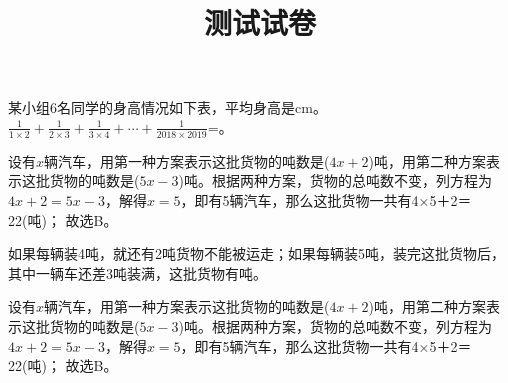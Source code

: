 \documentclass{BHCexam}
\begin{document}
\title{测试试卷}




\maketitle
\begin{groups}
\begin{questions}[p]
\question[] 某小组6名同学的身高情况如下表，平均身高是cm。\( \displaystyle \frac{1}{1\times 2}+\frac{1}{2\times 3}+\frac{1}{3\times 4}+\cdots +\frac{1}{2018\times 2019}\)=。 
\begin{solution}{4cm} 
\methodonly 设有\( x\)辆汽车，用第一种方案表示这批货物的吨数是(\( 4x+2\))吨，用第二种方案表示这批货物的吨数是(\( 5x-3\))吨。根据两种方案，货物的总吨数不变，列方程为\( 4x+2=5x-3\)，解得\( x=5\)，即有5辆汽车，那么这批货物一共有4×5＋2＝22(吨)； 故选B。 
\end{solution} 
\question[] 如果每辆装4吨，就还有2吨货物不能被运走；如果每辆装5吨，装完这批货物后，其中一辆车还差3吨装满，这批货物有吨。 
\begin{solution}{4cm} 
\methodonly 设有\( x\)辆汽车，用第一种方案表示这批货物的吨数是(\( 4x+2\))吨，用第二种方案表示这批货物的吨数是(\( 5x-3\))吨。根据两种方案，货物的总吨数不变，列方程为\( 4x+2=5x-3\)，解得\( x=5\)，即有5辆汽车，那么这批货物一共有4×5＋2＝22(吨)； 故选B。 
\end{solution} 
 
\end{questions}

\end{groups}
\end{document}
